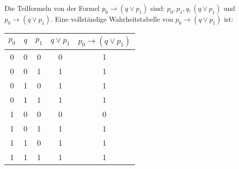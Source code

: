 \begin{bsp}
    Die Teilformeln von der Formel $p_0\to (q\lor p_1)$ sind: $p_0,p_1,q,(q\lor p_1)$ und $p_0\to (q\lor p_1)$. Eine vollständige Wahrheitstabelle von $p_0\to (q\lor p_1)$ ist:
    \begin{center}
        \begin{tabular} {| c | c | c || c | c |}
            \hline
            $p_0$ & $q$ & $p_1$ & $q\lor p_1$ & $p_0\to (q\lor p_1)$ \\ \hline
            0 & 0 & 0 & 0 & 1 \\
            0 & 0 & 1 & 1 & 1\\
            0 & 1 & 0 & 1 & 1\\
            0 & 1 & 1 & 1& 1\\
            1 & 0 & 0 & 0 & 0\\
            1 & 0 & 1 & 1 & 1\\
            1 & 1 & 0 & 1 & 1\\
            1 & 1 & 1 & 1 & 1\\ \hline
        \end{tabular}
    \end{center}
    \smallskip
\end{bsp}

